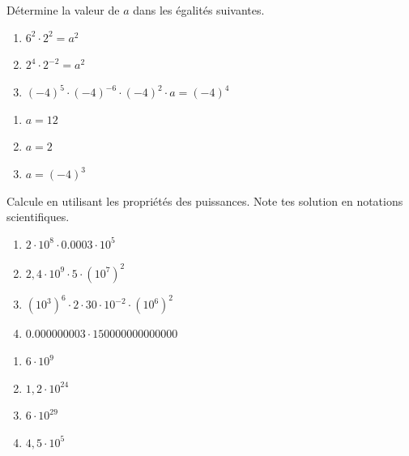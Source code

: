 \begin{exercise}
  Détermine la valeur de $a$ dans les égalités suivantes.
  \begin{enumerate}
    \item $6^{2} \cdot 2^{2} = a^{2}$
    \item $2^{4} \cdot 2^{- 2} = a^{2}$
    \item $( - 4)^{5} \cdot ( - 4)^{- 6} \cdot ( - 4)^{2} \cdot a = ( - 4)^{4}$
  \end{enumerate}
\end{exercise}
\begin{solution}
  \begin{enumerate}[cols=3]
    \item $a=12$
    \item $a=2$
    \item $a=(-4)^3$
  \end{enumerate}
\end{solution}
\newpage

\begin{exercise}
  Calcule en utilisant les propriétés des puissances. Note tes solution en notations scientifiques.
  \begin{enumerate}[cols=2]
    \item $2 \cdot 10^{8} \cdot \num{0,0003}\cdot 10^{5}$
    \item $2,4 \cdot 10^{9} \cdot 5 \cdot \left( 10^{7} \right)^{2}$
    \item $\left( 10^{3} \right)^{6} \cdot 2 \cdot 30 \cdot 10^{- 2} \cdot \left( 10^{6} \right)^{2}$
    \item $\num{0,000000003} \cdot \num{150000000000000}$
  \end{enumerate}
\end{exercise}
\begin{solution}
  \begin{enumerate}[cols=4]
    \item $6\cdot 10^9$
    \item $1,2\cdot 10^{24}$
    \item $6\cdot 10^{29}$
    \item $4,5\cdot 10^{5}$
  \end{enumerate}
\end{solution}


